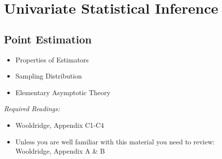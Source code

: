 \documentclass{article}
\begin{document}
%
%


\section{Univariate Statistical Inference}

\subsection{Point Estimation}
\begin{itemize}
   \item Properties of Estimators
   \item Sampling Distribution
   \item Elementary Asymptotic Theory
\end{itemize}
\textit{Required Readings:}
\begin{itemize}
  \item Wooldridge, Appendix C1-C4
  \item Unless you are well familiar with this material you need to review: Wooldridge, Appendix A \& B
\end{itemize}
\end{document}
